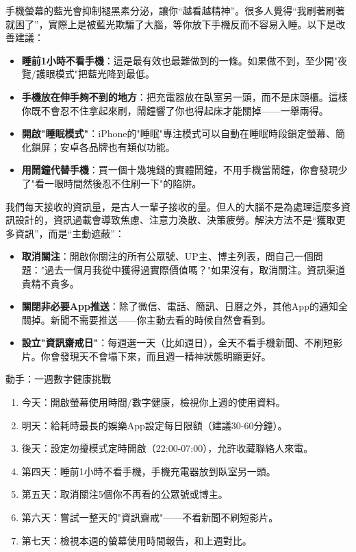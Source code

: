 
手機螢幕的藍光會抑制褪黑素分泌，讓你“越看越精神”。很多人覺得“我刷著刷著就困了”，實際上是被藍光欺騙了大腦，等你放下手機反而不容易入睡。以下是改善建議：

\begin{itemize}
  \item \textbf{睡前1小時不看手機}：這是最有效也最難做到的一條。如果做不到，至少開"夜覽/護眼模式"把藍光降到最低。
  \item \textbf{手機放在伸手夠不到的地方}：把充電器放在臥室另一頭，而不是床頭櫃。這樣你既不會忍不住拿起來刷，鬧鐘響了你也得起床才能關掉——一舉兩得。
  \item \textbf{開啟"睡眠模式"}：iPhone的"睡眠"專注模式可以自動在睡眠時段鎖定螢幕、簡化鎖屏；安卓各品牌也有類似功能。
  \item \textbf{用鬧鐘代替手機}：買一個十幾塊錢的實體鬧鐘，不用手機當鬧鐘，你會發現少了"看一眼時間然後忍不住刷一下"的陷阱。
\end{itemize}


我們每天接收的資訊量，是古人一輩子接收的量。但人的大腦不是為處理這麼多資訊設計的，資訊過載會導致焦慮、注意力渙散、決策疲勞。解決方法不是“獲取更多資訊”，而是“主動遮蔽”：

\begin{itemize}
  \item \textbf{取消關注}：開啟你關注的所有公眾號、UP主、博主列表，問自己一個問題："過去一個月我從中獲得過實際價值嗎？"如果沒有，取消關注。資訊渠道貴精不貴多。
  \item \textbf{關閉非必要App推送}：除了微信、電話、簡訊、日曆之外，其他App的通知全關掉。新聞不需要推送——你主動去看的時候自然會看到。
  \item \textbf{設立"資訊齋戒日"}：每週選一天（比如週日），全天不看手機新聞、不刷短影片。你會發現天不會塌下來，而且週一精神狀態明顯更好。
\end{itemize}

\begin{tcbpractice}{動手：一週數字健康挑戰}
\begin{enumerate}
  \item 今天：開啟螢幕使用時間/數字健康，檢視你上週的使用資料。
  \item 明天：給耗時最長的娛樂App設定每日限額（建議30-60分鐘）。
  \item 後天：設定勿擾模式定時開啟（22:00-07:00），允許收藏聯絡人來電。
  \item 第四天：睡前1小時不看手機，手機充電器放到臥室另一頭。
  \item 第五天：取消關注5個你不再看的公眾號或博主。
  \item 第六天：嘗試一整天的"資訊齋戒"——不看新聞不刷短影片。
  \item 第七天：檢視本週的螢幕使用時間報告，和上週對比。
\end{enumerate}

\end{tcbpractice}

